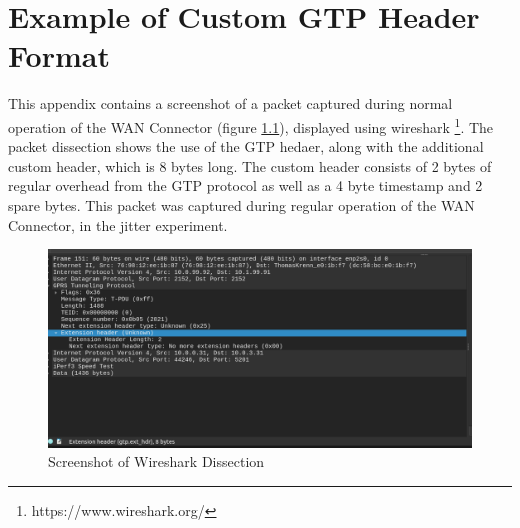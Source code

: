 
\cleardoublepage
\chapter{Example of Custom GTP Header Format}
\label{appendix:gtp}

This appendix contains a screenshot of a packet captured during normal operation of the WAN Connector (figure \ref{fig:wshark}), displayed using wireshark \footnote{https://www.wireshark.org/}. The packet dissection shows the use of the GTP hedaer, along with the additional custom header, which is 8 bytes long. The custom header consists of 2 bytes of regular overhead from the GTP protocol as well as a 4 byte timestamp and 2 spare bytes. This packet was captured during regular operation of the WAN Connector, in the jitter experiment.

\begin{figure}[ht]
    \centering
	\includegraphics[width=\linewidth]{fig/gtp_2.png}
	\caption{Screenshot of Wireshark Dissection}
	\label{fig:wshark}
\end{figure} 

